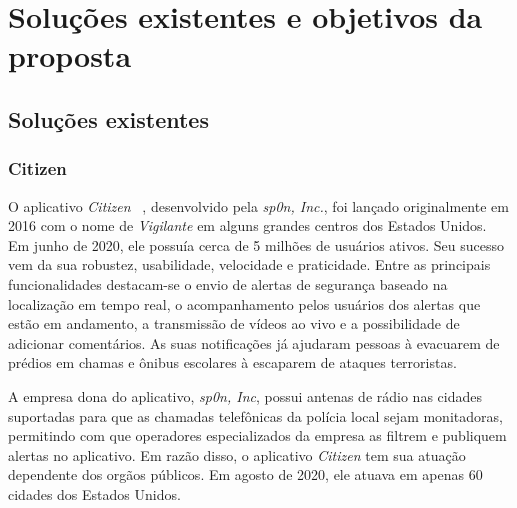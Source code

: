 \chapter{Soluções existentes e objetivos da proposta}



\section{Soluções existentes}


\subsection{Citizen}

O aplicativo \emph{Citizen} ~\cite{citizen}, desenvolvido pela \emph{sp0n, Inc.}, foi lançado originalmente em 2016 com o nome de \emph{Vigilante} em alguns grandes centros dos Estados Unidos. Em junho de 2020, ele possuía cerca de 5 milhões de usuários ativos. Seu sucesso vem da sua robustez, usabilidade, velocidade e praticidade. Entre as principais funcionalidades destacam-se o envio de alertas de segurança baseado na localização em tempo real, o acompanhamento pelos usuários dos alertas que estão em andamento, a transmissão de vídeos ao vivo e a possibilidade de adicionar comentários. As suas notificações já ajudaram pessoas à evacuarem de prédios em chamas e ônibus escolares à escaparem de ataques terroristas. 

A empresa dona do aplicativo, \emph{sp0n, Inc}, possui antenas de rádio nas cidades suportadas para que as chamadas telefônicas da polícia local sejam monitadoras, permitindo com que operadores especializados da empresa as filtrem e publiquem alertas no aplicativo. Em razão disso, o aplicativo \emph{Citizen} tem sua atuação dependente dos orgãos públicos. Em agosto de 2020, ele atuava em apenas 60 cidades dos Estados Unidos.

